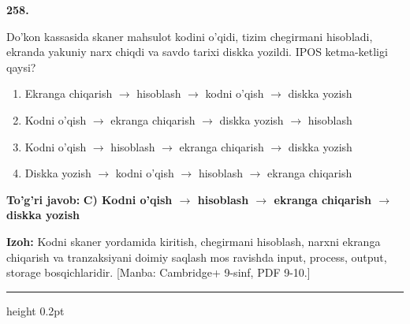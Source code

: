 \documentclass[10pt,a4paper]{article}
\begin{document}
{\bfseries\sffamily\color{ink} 258.}
\par
Do'kon kassasida skaner mahsulot kodini o'qidi, tizim chegirmani hisobladi, ekranda yakuniy narx chiqdi va savdo tarixi diskka yozildi. IPOS ketma-ketligi qaysi?
\begin{enumerate}[label=\Alph*),leftmargin=9mm]
\item Ekranga chiqarish \ensuremath{\rightarrow} hisoblash \ensuremath{\rightarrow} kodni o'qish \ensuremath{\rightarrow} diskka yozish
\item Kodni o'qish \ensuremath{\rightarrow} ekranga chiqarish \ensuremath{\rightarrow} diskka yozish \ensuremath{\rightarrow} hisoblash
\item Kodni o'qish \ensuremath{\rightarrow} hisoblash \ensuremath{\rightarrow} ekranga chiqarish \ensuremath{\rightarrow} diskka yozish
\item Diskka yozish \ensuremath{\rightarrow} kodni o'qish \ensuremath{\rightarrow} hisoblash \ensuremath{\rightarrow} ekranga chiqarish
\end{enumerate}
\begin{tcolorbox}[enhanced,breakable,colback=teal!4,colframe=teal!60!black,boxrule=0.45pt,arc=1.2mm,left=2.7mm,right=2.7mm,top=1.8mm,bottom=1.8mm,before skip=2mm,after skip=2mm]
{\bfseries\sffamily\color{teal}To'g'ri javob:} \textbf{C) Kodni o'qish \ensuremath{\rightarrow} hisoblash \ensuremath{\rightarrow} ekranga chiqarish \ensuremath{\rightarrow} diskka yozish}
\par\smallskip
{\bfseries Izoh:} Kodni skaner yordamida kiritish, chegirmani hisoblash, narxni ekranga chiqarish va tranzaksiyani doimiy saqlash mos ravishda input, process, output, storage bosqichlaridir. [Manba: Cambridge+ 9-sinf, PDF 9-10.]
\end{tcolorbox}
\vspace{2mm}\hrule height 0.2pt\vspace{3mm}
\end{document}
